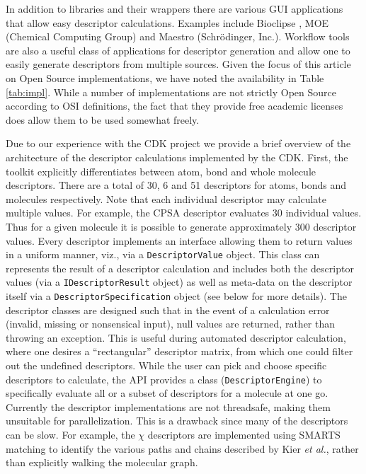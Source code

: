 \documentclass[letterpaper, 12pt]{article}
\begin{document}
In addition to libraries and their wrappers there are various GUI
applications that allow easy descriptor calculations. Examples include
Bioclipse \cite{Spjuth:2007aa}, MOE (Chemical Computing Group) and
Maestro (Schr\"{o}dinger, Inc.). Workflow tools are also a useful
class of applications for descriptor generation and allow one to
easily generate descriptors from multiple sources. Given the focus of
this article on Open Source implementations, we have noted the
availability in Table \ref{tab:impl}. While a number of
implementations are not strictly Open Source according to OSI
definitions, the fact that they provide free academic licenses does
allow them to be used somewhat freely.

Due to our experience with the CDK project we provide a brief overview
of the architecture of the descriptor calculations implemented by the
CDK. First, the toolkit explicitly differentiates between atom, bond
and whole molecule descriptors. There are a total of 30, 6 and 51
descriptors for atoms, bonds and molecules respectively. Note that
each individual descriptor may calculate multiple values. For example,
the CPSA descriptor evaluates 30 individual values. Thus for a given
molecule it is possible to generate approximately 300 descriptor
values. Every descriptor implements an interface allowing them to
return values in a uniform manner, viz., via a
\texttt{DescriptorValue} object. This class can represents the result
of a descriptor calculation and includes both the descriptor values
(via a \texttt{IDescriptorResult} object) as well as meta-data on the
descriptor itself via a \texttt{DescriptorSpecification} object (see
below for more details). The descriptor classes are designed such that
in the event of a calculation error (invalid, missing or nonsensical
input), null values are returned, rather than throwing an
exception. This is useful during automated descriptor calculation,
where one desires a ``rectangular'' descriptor matrix, from which one
could filter out the undefined descriptors. While the user can pick
and choose specific descriptors to calculate, the API provides a class
(\texttt{DescriptorEngine}) to specifically evaluate all or a subset
of descriptors for a molecule at one go.  Currently the descriptor
implementations are not threadsafe, making them unsuitable for
parallelization. This is a drawback since many of the descriptors can
be slow. For example, the $\chi$ descriptors \cite{Kier:1976aa} are
implemented using SMARTS matching to identify the various paths and
chains described by Kier \textit{et al.}, rather than explicitly walking the
molecular graph.
\end{document}
